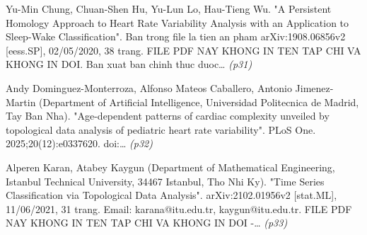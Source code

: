 \begin{enumerate}[leftmargin=1.6em,itemsep=2pt,label={[\arabic*]}]
\item {\small Yu-Min Chung, Chuan-Shen Hu, Yu-Lun Lo, Hau-Tieng Wu. "A Persistent Homology Approach to Heart Rate Variability Analysis with an Application to Sleep-Wake Classification". Ban trong file la tien an pham arXiv:1908.06856v2 [eess.SP], 02/05/2020, 38 trang. FILE PDF NAY KHONG IN TEN TAP CHI VA KHONG IN DOI. Ban xuat ban chinh thuc duoc…} \hfill{\scriptsize\itshape (p31)}
\item {\small Andy Dominguez-Monterroza, Alfonso Mateos Caballero, Antonio Jimenez-Martin (Department of Artificial Intelligence, Universidad Politecnica de Madrid, Tay Ban Nha). "Age-dependent patterns of cardiac complexity unveiled by topological data analysis of pediatric heart rate variability". PLoS One. 2025;20(12):e0337620. doi:…} \hfill{\scriptsize\itshape (p32)}
\item {\small Alperen Karan, Atabey Kaygun (Department of Mathematical Engineering, Istanbul Technical University, 34467 Istanbul, Tho Nhi Ky). "Time Series Classification via Topological Data Analysis". arXiv:2102.01956v2 [stat.ML], 11/06/2021, 31 trang. Email: karana@itu.edu.tr, kaygun@itu.edu.tr. FILE PDF NAY KHONG IN TEN TAP CHI VA KHONG IN DOI -…} \hfill{\scriptsize\itshape (p33)}
\end{enumerate}